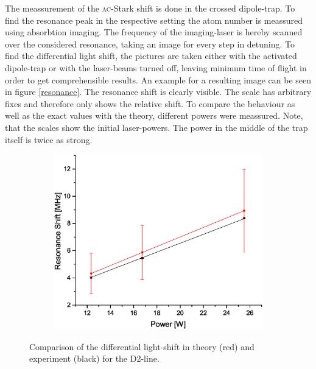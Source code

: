The meassurement of the \textsc{ac}-Stark shift is done in the crossed dipole-trap. To find the resonance peak in the respective setting the atom number is meassured using absorbtion imaging. The frequency of the imaging-laser is hereby scanned over the considered resonance, taking an image for every step in detuning. To find the differential light shift, the pictures are taken either with the activated dipole-trap or with the laser-beams turned off, leaving minimum time of flight in order to get comprehensible results. An example for a resulting image can be seen in figure \ref{resonance}. The resonance shift is clearly visible. The scale has arbitrary fixes and therefore only shows the relative shift. To compare the behaviour as well as the exact values with the theory, different powers were meassured. Note, that the scales show the initial laser-powers. The power in the middle of the trap itself is twice as strong.

\begin{figure}[H]
\centering
\begin{subfigure}[b]{0.8\textwidth}
                \includegraphics[width=\textwidth]{Shift2}
\end{subfigure}
\caption{Comparison of the differential light-shift in theory (red) and experiment (black) for the D2-line.}
\label{shifts}
\end{figure}


